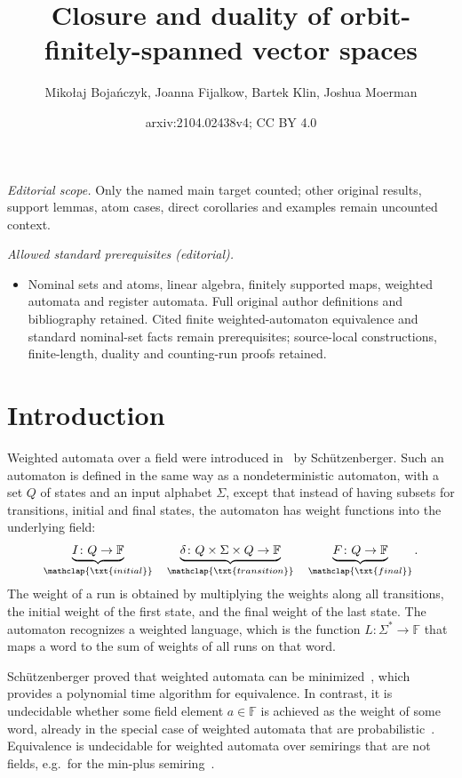 \documentclass[10pt,a4paper]{amsart}
\title{Closure and duality of orbit-finitely-spanned vector spaces}
\author{Mikołaj Bojańczyk, Joanna Fijalkow, Bartek Klin, Joshua Moerman}
\date{arxiv:2104.02438v4; CC BY 4.0}
\numberwithin{equation}{section}
\newcommand{\myunderbrace}[2]{\underbrace{#1}_{\mathclap{\txt{\scriptsize #2}}}}
\newcommand{\field}{\mathbb F}
\newcommand{\schutz}{Sch\"utzenberger\xspace}
\begin{document}
\maketitle
\noindent\textit{Editorial scope.} Only the named main target counted; other original results, support lemmas, atom cases, direct corollaries and examples remain uncounted context.\par\medskip
\noindent\textit{Allowed standard prerequisites (editorial).}\begin{itemize}
\item Nominal sets and atoms, linear algebra, finitely supported maps, weighted automata and register automata. Full original author definitions and bibliography retained. Cited finite weighted-automaton equivalence and standard nominal-set facts remain prerequisites; source-local constructions, finite-length, duality and counting-run proofs retained.
\end{itemize}\medskip
\section{Introduction}
Weighted automata over a field were introduced in~\cite{schutzenberger1961definition} by \schutz. Such an automaton is defined in the same way as a nondeterministic automaton, with a set $Q$ of states and an input alphabet $\Sigma$, except that instead of having subsets for transitions, initial and final states, the automaton has weight functions into the underlying field:
\begin{align*}
    \myunderbrace{I \colon Q \to \field}{initial} 
    \quad 
    \myunderbrace{\delta \colon Q \times \Sigma \times Q \to \field}{transition}
    \quad 
    \myunderbrace{F \colon Q \to \field}{final}.
\end{align*}
The weight of a run is obtained by multiplying the weights along all transitions, the initial weight of the first state, and the final weight of the last state. The  automaton recognizes a weighted language, which  is the function $L \colon \Sigma^* \to \field$ that maps a word to the sum of weights of all runs on that word.   

\schutz proved that weighted automata can be minimized~\cite[Sec.~B]{schutzenberger1961definition},
which provides a polynomial time algorithm for equivalence.
In contrast, it is undecidable whether some field element $a \in \field$ is achieved as the weight of some  word,  already in the special case of weighted automata that are probabilistic~\cite[Thm.~22]{nasu1969mappings}. Equivalence  is undecidable for weighted automata over semirings that are not fields, e.g.~for the min-plus semiring~\cite[Cor.~4.3]{krob1992}.
\end{document}
